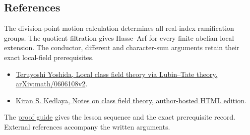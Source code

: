 \documentclass[11pt,a4paper]{article}
\newcommand{\tightlist}{\setlength{\itemsep}{0pt}\setlength{\parskip}{0pt}}
\begin{document}
\subsection{References}\label{references}

The division-point motion calculation determines all real-index
ramification groups. The quotient filtration gives Hasse--Arf for every
finite abelian local extension. The conductor, different and
character-sum arguments retain their exact local-field prerequisites.

\begin{itemize}
\tightlist
\item
  \href{https://arxiv.org/abs/math/0606108v2}{Teruyoshi Yoshida, Local
  class field theory via Lubin--Tate theory, arXiv:math/0606108v2}.
\item
  \href{https://kskedlaya.org/cft/sec_abstractcft1.html}{Kiran S.
  Kedlaya, Notes on class field theory, author-hosted HTML edition}.
\end{itemize}

The \href{../free-proofs.html}{proof guide} gives the lesson sequence
and the exact prerequisite record. External references accompany the
written arguments.
\end{document}
